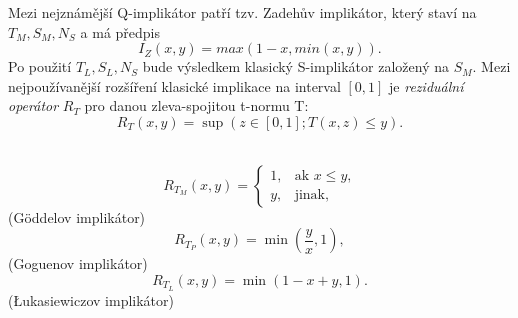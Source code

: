 \begin{graph}

\end{graph}

Mezi nejznámější Q-implikátor patří tzv. Zadeh\r uv implikátor, který staví na $T_M, S_M, N_S$ a má předpis $$I_Z(x,y) = max(1-x, min(x,y)).$$ Po použití $T_L, S_L, N_S$ bude výsledkem klasický S-implikátor založený na $S_M.$
Mezi nejpoužívanější rozšíření klasické implikace na interval $[0,1]$ je \textit{reziduální operátor} $R_T$ pro danou zleva-spojitou t-normu T: $$ R_T(x,y)=\sup(z \in [0,1]; T(x,z) \leq y).$$

\begin{example}
    \cite{hlinena}\\
     $$ R_{T_M}(x,y)=\begin{cases} 1, &\mbox {ak $x\leq y$,} \\y, &\mbox{jinak,} \end{cases} $$
    (Göddelov implik\' ator)
     $$ R_{T_P}(x,y)=\min \left (\frac yx,1 \right ),$$
    (Goguenov implikátor)
     $$ R_{T_L}(x,y)=\min(1-x+y,1).$$
    (\L{}ukasiewiczov implikátor)\\
\end{example}

